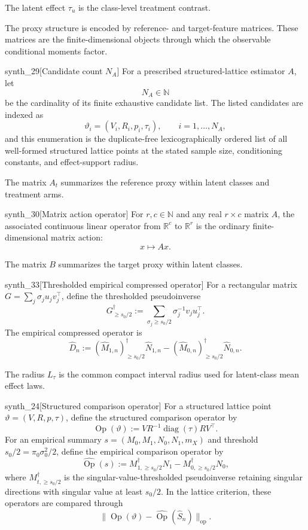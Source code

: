 The latent effect \(\tau_u\) is the class-level treatment contrast.

The proxy structure is encoded by reference- and target-feature matrices. These matrices are the finite-dimensional objects through which the observable conditional moments factor.

\begin{definitionv}{synth_29}[Candidate count \(N_A\)]
For a prescribed structured-lattice estimator \(A\), let
\[
N_A\in\mathbb N
\]
be the cardinality of its finite exhaustive candidate list. The listed candidates are indexed as
\[
\vartheta_i=(V_i,R_i,p_i,\tau_i),
\qquad i=1,\ldots,N_A,
\]
and this enumeration is the duplicate-free lexicographically ordered list of all well-formed structured lattice points at the stated sample size, conditioning constants, and effect-support radius.
\end{definitionv}

The matrix \(A_t\) summarizes the reference proxy within latent classes and treatment arms.

\begin{definitionv}{synth_30}[Matrix action operator]
For \(r,c\in\mathbb N\) and any real \(r\times c\) matrix \(A\), the associated continuous linear operator from \(\mathbb R^c\) to \(\mathbb R^r\) is the ordinary finite-dimensional matrix action:
\[
x\longmapsto Ax .
\]
\end{definitionv}

The matrix \(B\) summarizes the target proxy within latent classes.

\begin{definitionv}{synth_33}[Thresholded empirical compressed operator]
For a rectangular matrix \(G=\sum_j\sigma_j u_jv_j^\top\), define the thresholded pseudoinverse \[G^\dagger_{\ge s_0/2}:=\sum_{\sigma_j\ge s_0/2}\sigma_j^{-1}v_ju_j^\top.\] The empirical compressed operator is \[\widehat D_n:=(\widehat M_{1,n})^\dagger_{\ge s_0/2}\widehat N_{1,n}-(\widehat M_{0,n})^\dagger_{\ge s_0/2}\widehat N_{0,n}.\]
\end{definitionv}

The radius \(L_{\tau}\) is the common compact interval radius used for latent-class mean effect laws.

\begin{definitionv}{synth_24}[Structured comparison operator]
For a structured lattice point \(\vartheta=(V,R,p,\tau)\), define the structured comparison operator by
\[
\operatorname{Op}(\vartheta):=VR^{-1}\operatorname{diag}(\tau)RV^\top .
\]
For an empirical summary \(s=(M_0,M_1,N_0,N_1,m_X)\) and threshold \(s_0/2=\pi_0\sigma_0^2/2\), define the empirical comparison operator by
\[
\widehat{\operatorname{Op}}(s):=M_{1,\ge s_0/2}^{\dagger}N_1-M_{0,\ge s_0/2}^{\dagger}N_0,
\]
where \(M_{t,\ge s_0/2}^{\dagger}\) is the singular-value-thresholded pseudoinverse retaining singular directions with singular value at least \(s_0/2\). In the lattice criterion, these operators are compared through
\[
\|\operatorname{Op}(\vartheta)-\widehat{\operatorname{Op}}(\widehat S_n)\|_{\mathrm{op}}.
\]
\end{definitionv}

